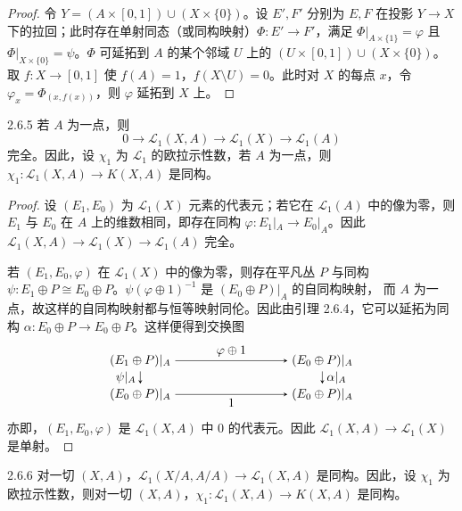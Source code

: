 \begin{proof}
  令 $Y=(A\times[0,1])\cup(X\times\{0\})$。设 $E',F'$ 分别为 $E,F$ 在投影 $Y\to X$ 下的拉回；此时存在单射同态（或同构映射）$\Phi\colon E'\to F'$，满足 $\Phi|_{A\times\{1\}}=\varphi$ 且 $\Phi|_{X\times\{0\}}=\psi$。$\Phi$ 可延拓到 $A$ 的某个邻域 $U$ 上的 $(U\times[0,1])\cup(X\times\{0\})$。取 $f\colon X\to[0,1]$ 使 $f(A)=1$，$f(X\setminus U)=0$。此时对 $X$ 的每点 $x$，令 $\varphi_x=\Phi_{(x,f(x))}$，则 $\varphi$ 延拓到 $X$ 上。
\end{proof}

\begin{lemma*}{2.6.5}
  若 $A$ 为一点，则
  \[
  0\longrightarrow\mathcal{L}_1(X,A)\longrightarrow\mathcal{L}_1(X)\longrightarrow\mathcal{L}_1(A)
  \]
  完全。因此，设 $\chi_1$ 为 $\mathcal{L}_1$ 的欧拉示性数，若 $A$ 为一点，则 $\chi_1\colon\mathcal{L}_1(X,A)\to K(X,A)$ 是同构。
\end{lemma*}

\begin{proof}
  设 $(E_1,E_0)$ 为 $\mathcal{L}_1(X)$ 元素的代表元；若它在 $\mathcal{L}_1(A)$ 中的像为零，则 $E_1$ 与 $E_0$ 在 $A$ 上的维数相同，即存在同构 $\varphi\colon E_1|_A\to E_0|_A$。因此 $\mathcal{L}_1(X,A)\to\mathcal{L}_1(X)\to\mathcal{L}_1(A)$ 完全。

  若 $(E_1,E_0,\varphi)$ 在 $\mathcal{L}_1(X)$ 中的像为零，则存在平凡丛 $P$ 与同构 $\psi\colon E_1\oplus P\cong E_0\oplus P$。$\psi(\varphi\oplus1)^{-1}$ 是 $(E_0\oplus P)|_A$ 的自同构映射，
  而 $A$ 为一点，故这样的自同构映射都与恒等映射同伦。因此由引理 2.6.4，它可以延拓为同构 $\alpha\colon E_0\oplus P\to E_0\oplus P$。这样便得到交换图
  \[
  \begin{tikzpicture}[baseline=(current bounding box.center),>=stealth,scale=0.95]
  \node (TL) at (0,1)  {$(E_1\oplus P)|_A$};
  \node (TR) at (5.4,1) {$(E_0\oplus P)|_A$};
  \node (BL) at (0,0)  {$(E_0\oplus P)|_A$};
  \node (BR) at (5.4,0) {$(E_0\oplus P)|_A$};
  \draw[->] (TL) -- node[above] {$\varphi\oplus1$} (TR);
  \draw[->] (TL) -- node[left] {$\psi|_A$} (BL);
  \draw[->] (TR) -- node[right] {$\alpha|_A$} (BR);
  \draw[->] (BL) -- node[below] {$1$} (BR);
  \end{tikzpicture}
  \]
  亦即，$(E_1,E_0,\varphi)$ 是 $\mathcal{L}_1(X,A)$ 中 $0$ 的代表元。因此 $\mathcal{L}_1(X,A)\to\mathcal{L}_1(X)$ 是单射。
\end{proof}

\begin{lemma*}{2.6.6}
  对一切 $(X,A)$，$\mathcal{L}_1(X/A,A/A)\to\mathcal{L}_1(X,A)$ 是同构。因此，设 $\chi_1$ 为欧拉示性数，则对一切 $(X,A)$，$\chi_1\colon\mathcal{L}_1(X,A)\to K(X,A)$ 是同构。
\end{lemma*}

